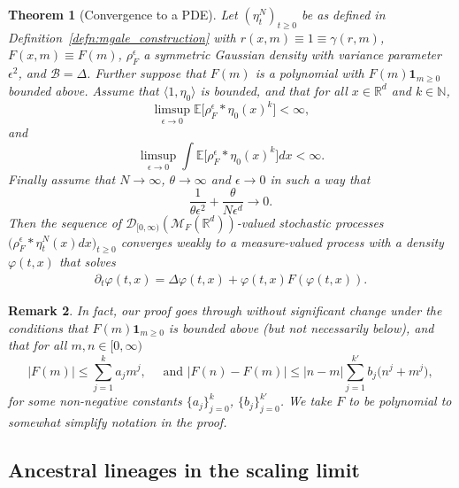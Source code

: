 \documentclass[12pt]{article}
\newtheorem{theorem}{Theorem}[section]
\newtheorem{remark}[theorem]{Remark}
\newcommand{\IE}{\mathbb E}
\newcommand{\IR}{\mathbb R}
\newcommand{\IN}{\mathbb N}
\newcommand{\ind}{\mathbf{1}}
\newcommand{\DG}{\mathcal{B}}  %
\newcommand{\measures}{\mathcal{M}_F(\IR^d)} %
\numberwithin{equation}{section}
\begin{document}
\begin{theorem}[Convergence to a PDE]
    \label{thm:local_convergence}
    Let $(\eta^N_t)_{t \geq 0}$
    be as defined in Definition~\ref{defn:mgale_construction} with
$r(x,m)\equiv 1\equiv \gamma(r,m)$, $F(x,m)\equiv F(m)$, 
$\rho^\epsilon_F$ a symmetric Gaussian density with variance
parameter $\epsilon^2$,
and $\DG=\Delta$. 
Further suppose that $F(m)$ is a polynomial with $F(m)\ind_{m\geq 0}$ bounded above.
Assume that $\langle 1,\eta_0\rangle$ is bounded, and that for all 
$x\in\IR^d$ and $k\in \IN$,
	\[
		\limsup_{\epsilon\to 0} 
		\IE\big[\rho_F^\epsilon*\eta_0(x)^k\big]<\infty,
	\]
	and 
\[
    \limsup_{\epsilon \to 0} \int \IE\big[\rho_F^\epsilon*\eta_0(x)^k\big] dx<\infty.
\]
Finally assume that $N \to \infty$, $\theta \to \infty$
and $\epsilon \to 0$ in such a way that
\begin{equation}
\frac{1}{\theta\epsilon^2}+\frac{\theta}{N\epsilon^d}\to 0.
\end{equation}
Then the sequence of 
    ${\mathcal D}_{[0,\infty)}(\measures)$-valued
stochastic processes $\big(\rho_F^\epsilon*\eta^N_t(x)dx\big)_{t \ge 0}$
converges weakly
to a measure-valued process with a density $\varphi(t, x)$
that solves
\begin{align}
	\label{target equation in local convergence}
        \partial_t \varphi(t, x)=\Delta \varphi (t,x) +\varphi(t,x) F(\varphi(t,x)).
\end{align}
\end{theorem}

\begin{remark}
In fact,
our proof goes through without significant change under the conditions that
$F(m)\ind_{m\geq 0}$ is bounded above (but not necessarily below), and that
for all $m,n\in[0,\infty)$
\[
|F(m)|\leq\sum_{j=1}^ka_jm^j, \quad\mbox{ and }
|F(n)-F(m)|
\leq|n-m|\sum_{j=1}^{k'}b_j\Big(n^j+m^j\Big),
\]
for some non-negative constants $\{a_j\}_{j=0}^k$, $\{b_j\}_{j=0}^{k'}$.
We take $F$ to be polynomial to somewhat simplify notation in the proof.
\end{remark}

\subsection{Ancestral lineages in the scaling limit}
\label{sec:ancestral lineages}
\end{document}
